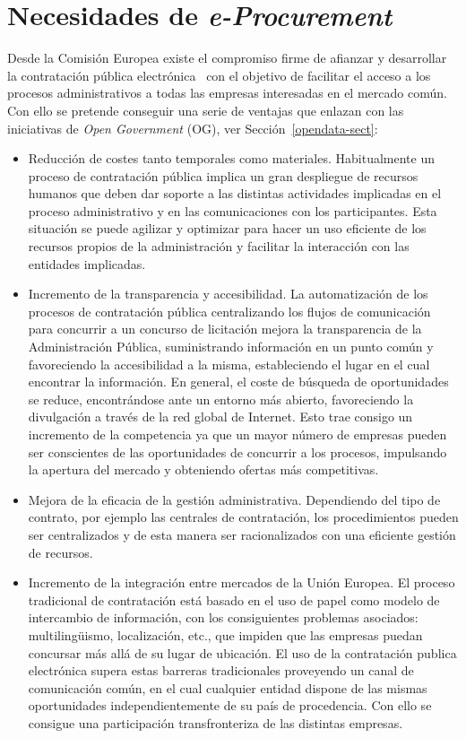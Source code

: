 \section{Necesidades de \textit{e-Procurement}}
Desde la Comisión Europea existe el compromiso firme de afianzar y desarrollar la contratación
pública electrónica~\cite{plan2004,e-Proc-green-paper,ePractice} con el objetivo de facilitar el acceso a los procesos administrativos a todas
las empresas interesadas en el mercado común. Con ello se pretende conseguir una serie
de ventajas que enlazan con las iniciativas de \textit{Open Government} (\gls{OG}), ver Sección~\ref{opendata-sect}:
\begin{itemize}
 \item Reducción de costes tanto temporales como materiales. Habitualmente un proceso
de contratación pública implica un gran despliegue de recursos humanos que deben dar 
soporte a las distintas actividades implicadas en el proceso administrativo y en las
comunicaciones con los participantes. Esta situación se puede agilizar y optimizar
para hacer un uso eficiente de los recursos propios de la administración y facilitar
la interacción con las entidades implicadas.
\item Incremento de la transparencia y accesibilidad. La automatización de los procesos
de contratación pública centralizando los flujos de comunicación para concurrir a un concurso
de licitación mejora la transparencia de la Administración Pública, suministrando información
en un punto común y favoreciendo la accesibilidad a la misma, estableciendo el lugar 
en el cual encontrar la información. En general, el coste de búsqueda de oportunidades
se reduce, encontrándose ante un entorno más abierto, favoreciendo la divulgación a través
de la red global de Internet. Esto trae consigo un incremento de la competencia
ya que un mayor número de empresas pueden ser conscientes de las oportunidades de concurrir
a los procesos, impulsando la apertura del mercado y obteniendo ofertas más competitivas.
\item Mejora de la eficacia de la gestión administrativa. Dependiendo del tipo de contrato,
por ejemplo las centrales de contratación, los procedimientos pueden ser centralizados y de esta manera
ser racionalizados con una eficiente gestión de recursos.
\item Incremento de la integración entre mercados de la Unión Europea. El proceso
tradicional de contratación está basado en el uso de papel como modelo de intercambio
de información, con los consiguientes problemas asociados: multiling\"{u}ismo, localización, etc.,  
que impiden que las empresas puedan concursar más allá de su lugar de ubicación. El uso de la contratación
publica electrónica supera estas barreras tradicionales proveyendo un canal de comunicación
común, en el cual cualquier entidad dispone de las mismas oportunidades independientemente
de su país de procedencia. Con ello se consigue una participación transfronteriza
de las distintas empresas.
\end{itemize}

